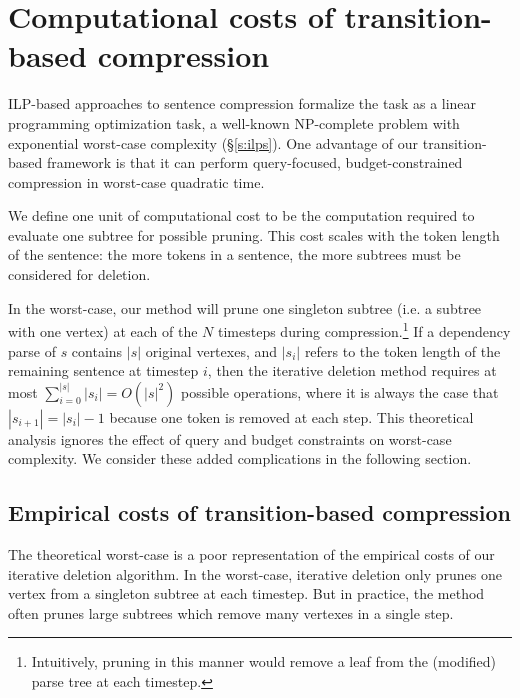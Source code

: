 \documentclass[11pt,a4paper]{article}
\begin{document}
\section{Computational costs of transition-based compression}\label{s:costs}

ILP-based approaches to sentence compression formalize the task as a linear programming optimization task, a well-known NP-complete problem with exponential worst-case complexity (\S\ref{s:ilps}). One advantage of our transition-based framework is that it can perform query-focused, budget-constrained compression in worst-case quadratic time. 

We define one unit of computational cost to be the computation required to evaluate one subtree for possible pruning. This cost scales with the token length of the sentence: the more tokens in a sentence, the more subtrees must be considered for deletion.  %

In the worst-case, our method will prune one singleton subtree (i.e. a subtree with one vertex) at each of the $N$ timesteps during compression.\footnote{Intuitively, pruning in this manner would remove a leaf from the (modified) parse tree at each timestep.} If a dependency parse of $s$ contains $|s|$ original vertexes, and $|s_i|$ refers to the token length of the remaining sentence at timestep $i$, then the iterative deletion method requires at most ${\sum_{i = 0}^{|s|} |s_i | = O(|s|^2)}$ possible operations, where it is always the case that $|s_{i + 1}| = |s_{i}|  - 1$ because one token is removed at each step. This theoretical analysis ignores the effect of query and budget constraints on worst-case complexity. We consider these added complications in the following section.

\subsection{Empirical costs of transition-based compression}\label{s:empiricalcost}

The theoretical worst-case is a poor representation of the empirical costs of our iterative deletion algorithm. In the worst-case, iterative deletion only prunes one vertex from a singleton subtree at each timestep. But in practice, the method often prunes large subtrees which remove many vertexes in a single step. 

\end{document}
